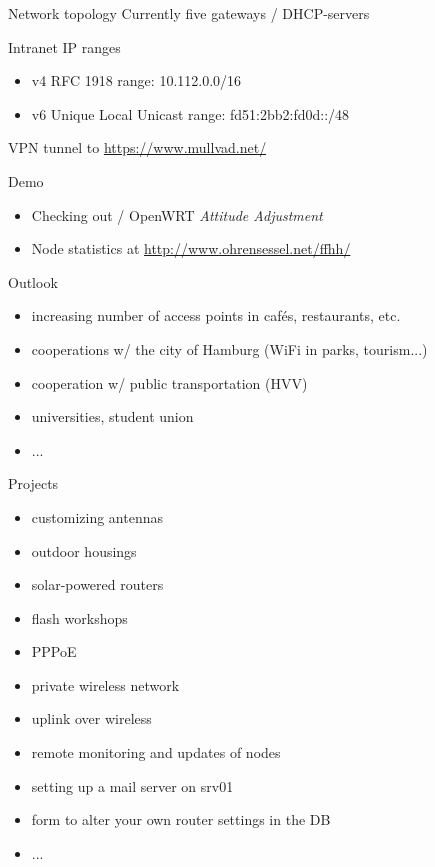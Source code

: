 \documentclass[c]{beamer}
\begin{document}
\begin{frame}{Network topology}
	Currently five gateways / DHCP-servers

	Intranet IP ranges
	\begin{itemize}
		\item v4 RFC 1918  range: 10.112.0.0/16
		\item v6 Unique Local Unicast range: fd51:2bb2:fd0d::/48 
	\end{itemize}
	VPN tunnel to \href{https://www.mullvad.net/}{https://www.mullvad.net/}
\end{frame}


\begin{frame}{Demo}
	\begin{itemize}
		\item Checking out / OpenWRT \it Attitude Adjustment
		\item Node statistics at \href{http://www.ohrensessel.net/ffhh/}{http://www.ohrensessel.net/ffhh/}
	\end{itemize}
\end{frame}


\begin{frame}{Outlook}
	\begin{itemize}
		\item increasing number of access points in cafés, restaurants, etc.
		\item cooperations w/ the city of Hamburg (WiFi in parks, tourism...)
		\item cooperation w/ public transportation (HVV)
		\item universities, student union
		\item ...
	\end{itemize}
\end{frame}


\begin{frame}{Projects}
	\begin{itemize}
		\item customizing antennas
		\item outdoor housings
		\item solar-powered routers
		\item flash workshops
		\item PPPoE
		\item private wireless network
		\item uplink over wireless
		\item remote monitoring and updates of nodes
		\item setting up a mail server on srv01
		\item form to alter your own router settings in the DB
		\item ...
	\end{itemize}
\end{frame}
\end{document}
